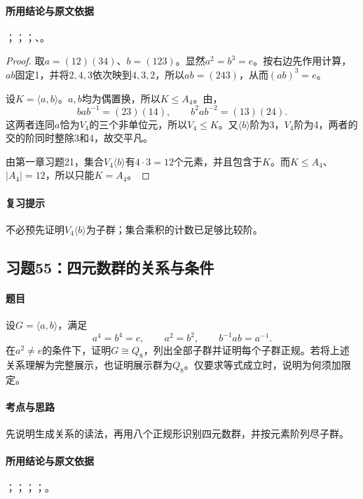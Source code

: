 \paragraph{所用结论与原文依据}
；；；、。


\begin{proof}
取$a=(12)(34)$、$b=(123)$。显然$a^2=b^3=e$。按右边先作用计算，$ab$固定1，并将$2,4,3$依次映到$4,3,2$，所以$ab=(243)$，从而$(ab)^3=e$。

设$K=\langle a,b\rangle$。$a,b$均为偶置换，所以$K\leq A_4$。由，
\[
bab^{-1}=(23)(14),\qquad b^2ab^{-2}=(13)(24).
\]
这两者连同$a$恰为$V_4$的三个非单位元，所以$V_4\leq K$。又$\langle b\rangle$阶为3，$V_4$阶为4，两者的交的阶同时整除3和4，故交平凡。

由第一章习题21，集合$V_4\langle b\rangle$有$4\cdot3=12$个元素，并且包含于$K$。而$K\leq A_4$、$|A_4|=12$，所以只能$K=A_4$。
\end{proof}

\paragraph{复习提示}
不必预先证明$V_4\langle b\rangle$为子群；集合乘积的计数已足够比较阶。


\subsection{习题55：\texorpdfstring{四元数群的关系与条件}{四元数群的关系与条件}}
\label{ex:2:55}

\paragraph{题目}
设$G=\langle a,b\rangle$，满足
\[
a^4=b^4=e,\qquad a^2=b^2,\qquad b^{-1}ab=a^{-1}.
\]
在$a^2\ne e$的条件下，证明$G\cong Q_8$，列出全部子群并证明每个子群正规。若将上述关系理解为完整展示，也证明展示群为$Q_8$。仅要求等式成立时，说明为何须加限定。

\paragraph{考点与思路}
先说明生成关系的读法，再用八个正规形识别四元数群，并按元素阶列尽子群。

\paragraph{所用结论与原文依据}
；；；；。


